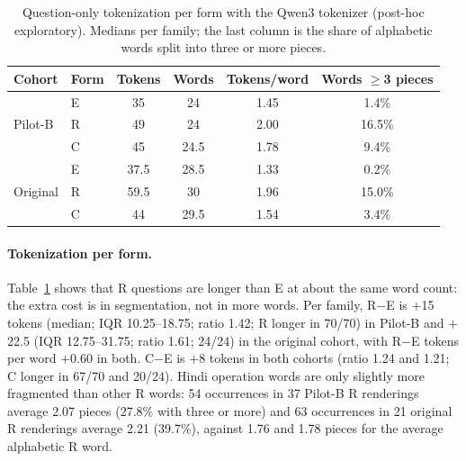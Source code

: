 \documentclass[12pt,a4paper,oneside]{report}
\renewcommand{\_}{\oldunderscore\allowbreak}
\begin{document}
\begin{table}[t]
\centering\small
\caption{Question-only tokenization per form with the Qwen3 tokenizer (post-hoc exploratory). Medians per family; the last column is the share of alphabetic words split into three or more pieces.}
\label{tab:tokfert}
\begin{tabular}{@{}llcccc@{}}
\toprule
Cohort & Form & Tokens & Words & Tokens/word & Words $\ge$3 pieces\\
\midrule
\multirow{3}{*}{Pilot-B} & E & 35 & 24 & 1.45 & 1.4\%\\
 & R & 49 & 24 & 2.00 & 16.5\%\\
 & C & 45 & 24.5 & 1.78 & 9.4\%\\
\midrule
\multirow{3}{*}{Original} & E & 37.5 & 28.5 & 1.33 & 0.2\%\\
 & R & 59.5 & 30 & 1.96 & 15.0\%\\
 & C & 44 & 29.5 & 1.54 & 3.4\%\\
\bottomrule
\end{tabular}
\end{table}

\paragraph{Tokenization per form.} Table~\ref{tab:tokfert} shows that R questions are longer than E at about the same word count: the extra cost is in segmentation, not in more words. Per family, R$-$E is $+$15 tokens (median; IQR 10.25--18.75; ratio 1.42; R longer in 70/70) in Pilot-B and $+$22.5 (IQR 12.75--31.75; ratio 1.61; 24/24) in the original cohort, with R$-$E tokens per word $+$0.60 in both. C$-$E is $+$8 tokens in both cohorts (ratio 1.24 and 1.21; C longer in 67/70 and 20/24). Hindi operation words are only slightly more fragmented than other R words: 54 occurrences in 37 Pilot-B R renderings average 2.07 pieces (27.8\% with three or more) and 63 occurrences in 21 original R renderings average 2.21 (39.7\%), against 1.76 and 1.78 pieces for the average alphabetic R word.
\end{document}
